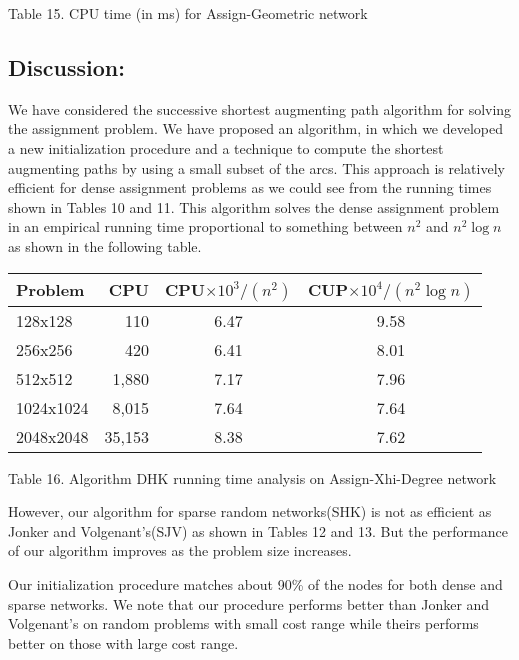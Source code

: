 \vskip 2pt
{Table 15. CPU time (in ms) for Assign-Geometric network}
\vskip 5pt

\subsection{Discussion:}

We have considered the successive shortest augmenting path
algorithm for solving the assignment problem. We have proposed
an algorithm, in which we developed a new initialization procedure
and a technique to compute the shortest augmenting paths by
using a small subset of the arcs. This approach is relatively
efficient for dense assignment problems as we could see from 
the running times shown in Tables 10 and 11. This algorithm 
solves the dense assignment problem
in an empirical running time proportional
to something between $n^2$ and $n^2\log n$ as shown in 
the following table.

\vskip 5pt
{\small
\begin{tabular}{|l|r|c|c|} \hline
Problem &CPU &CPU$\times 10^3/(n^2)$ &CUP$\times 10^4/(n^2\log n)$\\ \hline
128x128&  110&     6.47& 9.58\\
256x256&  420&     6.41& 8.01\\
512x512&  1,880&   7.17& 7.96\\
1024x1024& 8,015&  7.64& 7.64\\
2048x2048& 35,153& 8.38& 7.62\\ \hline
\end{tabular}
}

\vskip 2pt
{Table 16. Algorithm DHK running time analysis on Assign-Xhi-Degree 
network}
\vskip 5pt

However, our algorithm for sparse random networks(SHK) is not as efficient
as Jonker and Volgenant's(SJV) as shown in Tables 12 and 13. 
But the performance of
our algorithm improves as the problem size increases.

Our initialization procedure matches about 90\% of the nodes for
both dense and sparse networks. We note that our procedure
performs better than Jonker and Volgenant's on random problems with
small cost range while theirs performs better on those with large
cost range.



